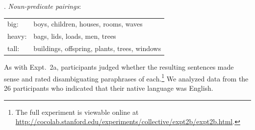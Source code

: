 \documentclass[preprint,12pt,authoryear,titlepage]{elsarticle}
\newcommand{\ndg}[1]{\textcolor{Green}{[ndg: #1]}}
\begin{document}
\ex. \emph{Noun-predicate pairings}:\\[2pt]
\begin{tabular}{ll}
	big:& boys, children, houses, rooms, waves\\
	heavy:& bags, lids, loads, men, trees\\
	tall:& buildings, offspring, plants, trees, windows
\end{tabular}	

As with Expt.~2a, participants judged whether the resulting sentences made sense and rated disambiguating paraphrases of each.\footnote{The full experiment is viewable online at \url{http://cocolab.stanford.edu/experiments/collective/expt2b/expt2b.html}.}  We analyzed data from the 26 participants who indicated that their native language was English.

%
%
%
%
\end{document}
